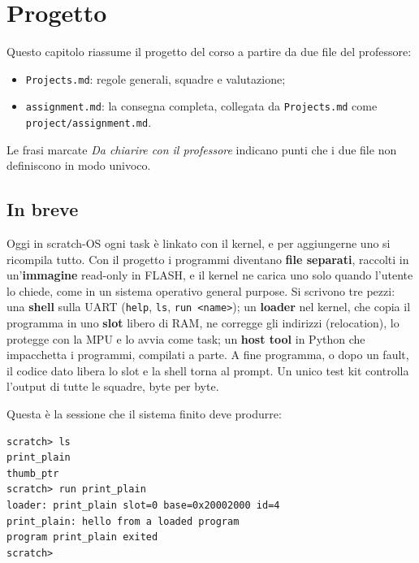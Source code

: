
\chapter{Progetto}

Questo capitolo riassume il progetto del corso a partire da due file del professore:
\begin{itemize}\sloppy
\item \texttt{Projects.md}: regole generali, squadre e valutazione;
\item \texttt{assignment.md}: la consegna completa, collegata da \texttt{Projects.md} come \texttt{project/assignment.md}.
\end{itemize}
Le frasi marcate \emph{Da chiarire con il professore} indicano punti che i due file non definiscono in modo univoco.

\section{In breve}

Oggi in scratch-OS ogni task è linkato con il kernel, e per aggiungerne uno si ricompila tutto. Con il progetto i programmi diventano \textbf{file separati}, raccolti in un'\textbf{immagine} read-only in FLASH, e il kernel ne carica uno solo quando l'utente lo chiede, come in un sistema operativo general purpose. Si scrivono tre pezzi: una \textbf{shell} sulla UART (\texttt{help}, \texttt{ls}, \texttt{run <name>}); un \textbf{loader} nel kernel, che copia il programma in uno \textbf{slot} libero di RAM, ne corregge gli indirizzi (relocation), lo protegge con la MPU e lo avvia come task; un \textbf{host tool} in Python che impacchetta i programmi, compilati a parte. A fine programma, o dopo un fault, il codice dato libera lo slot e la shell torna al prompt. Un unico test kit controlla l'output di tutte le squadre, byte per byte.

Questa è la sessione che il sistema finito deve produrre:
\begin{lstlisting}
scratch> ls
print_plain
thumb_ptr
scratch> run print_plain
loader: print_plain slot=0 base=0x20002000 id=4
print_plain: hello from a loaded program
program print_plain exited
scratch>
\end{lstlisting}


